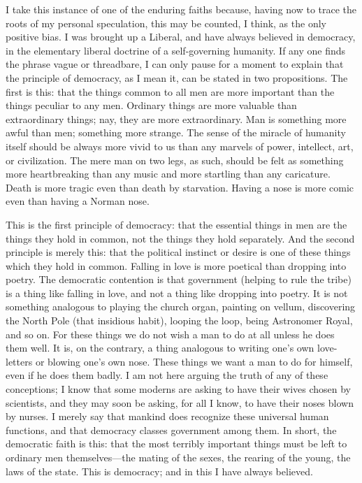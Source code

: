 I take this instance of one of the enduring faiths because, having now to trace the roots of my personal speculation, this may be counted, I think, as the only positive bias. I was brought up a Liberal, and have always believed in democracy, in the elementary liberal doctrine of a self-governing humanity. If any one finds the phrase vague or threadbare, I can only pause for a moment to explain that the principle of democracy, as I mean it, can be stated in two propositions. The first is this: that the things common to all men are more important than the things peculiar to any men. Ordinary things are more valuable than extraordinary things; nay, they are more extraordinary. Man is something more awful than men; something more strange. The sense of the miracle of humanity itself should be always more vivid to us than any marvels of power, intellect, art, or civilization. The mere man on two legs, as such, should be felt as something more heartbreaking than any music and more startling than any caricature. Death is more tragic even than death by starvation. Having a nose is more comic even than having a Norman nose.

This is the first principle of democracy: that the essential things in men are the things they hold in common, not the things they hold separately. And the second principle is merely this: that the political instinct or desire is one of these things which they hold in common. Falling in love is more poetical than dropping into poetry. The democratic contention is that government (helping to rule the tribe) is a thing like falling in love, and not a thing like dropping into poetry. It is not something analogous to playing the church organ, painting on vellum, discovering the North Pole (that insidious habit), looping the loop, being Astronomer Royal, and so on. For these things we do not wish a man to do at all unless he does them well. It is, on the contrary, a thing analogous to writing one’s own love-letters or blowing one’s own nose. These things we want a man to do for himself, even if he does them badly. I am not here arguing the truth of any of these conceptions; I know that some moderns are asking to have their wives chosen by scientists, and they may soon be asking, for all I know, to have their noses blown by nurses. I merely say that mankind does recognize these universal human functions, and that democracy classes government among them. In short, the democratic faith is this: that the most terribly important things must be left to ordinary men themselves—the mating of the sexes, the rearing of the young, the laws of the state. This is democracy; and in this I have always believed.


